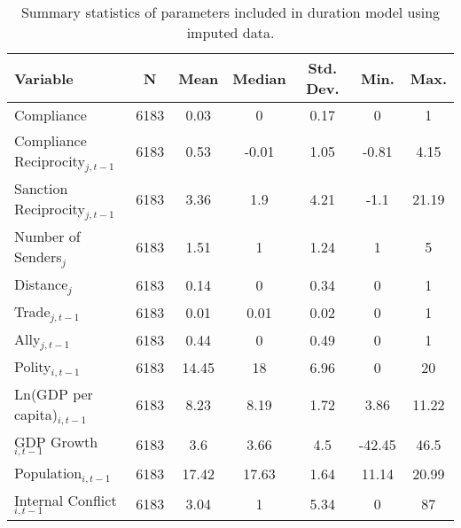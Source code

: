 \begin{table}[ht]
\centering
\begingroup\normalsize
\begin{tabular}{lcccccc}
 Variable & N & Mean & Median & Std. Dev. & Min. & Max. \\ 
  \hline
\hline
Compliance & 6183 & 0.03 & 0 & 0.17 & 0 & 1 \\ 
  Compliance Reciprocity$_{j,t-1}$ & 6183 & 0.53 & -0.01 & 1.05 & -0.81 & 4.15 \\ 
  Sanction Reciprocity$_{j,t-1}$ & 6183 & 3.36 & 1.9 & 4.21 & -1.1 & 21.19 \\ 
  Number of Senders$_{j}$ & 6183 & 1.51 & 1 & 1.24 & 1 & 5 \\ 
  Distance$_{j}$ & 6183 & 0.14 & 0 & 0.34 & 0 & 1 \\ 
  Trade$_{j,t-1}$ & 6183 & 0.01 & 0.01 & 0.02 & 0 & 1 \\ 
  Ally$_{j,t-1}$ & 6183 & 0.44 & 0 & 0.49 & 0 & 1 \\ 
  Polity$_{i,t-1}$ & 6183 & 14.45 & 18 & 6.96 & 0 & 20 \\ 
  Ln(GDP per capita)$_{i,t-1}$ & 6183 & 8.23 & 8.19 & 1.72 & 3.86 & 11.22 \\ 
  GDP Growth$_{i,t-1}$ & 6183 & 3.6 & 3.66 & 4.5 & -42.45 & 46.5 \\ 
  Population$_{i,t-1}$ & 6183 & 17.42 & 17.63 & 1.64 & 11.14 & 20.99 \\ 
  Internal Conflict$_{i,t-1}$ & 6183 & 3.04 & 1 & 5.34 & 0 & 87 \\ 
   \hline
\hline
\end{tabular}
\endgroup
\caption{Summary statistics of parameters included in duration model using imputed data.} 
\label{tab:summImp}
\end{table}
